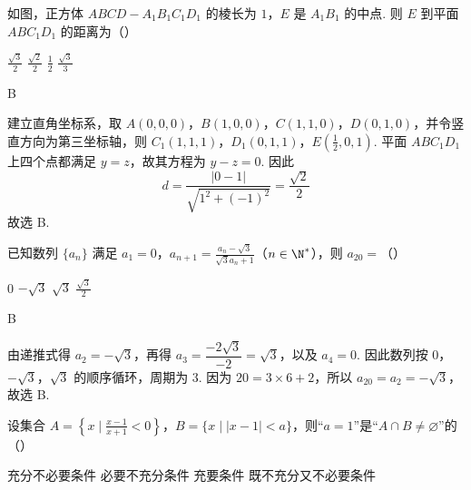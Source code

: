 \begin{problem}
如图，正方体 \(ABCD - A_{1}B_{1}C_{1}D_{1}\) 的棱长为 \(1\)，\(E\) 是 \(A_{1}B_{1}\) 的中点. 则 \(E\) 到平面 \(ABC_{1}D_{1}\) 的距离为（\quad）


\choices
    {\(\frac{\sqrt{3}}{2}\)}
    {\(\frac{\sqrt{2}}{2}\)}
    {\(\frac{1}{2}\)}
    {\(\frac{\sqrt{3}}{3}\)}
\end{problem}

\begin{answer}
B
\end{answer}

\begin{solution}
建立直角坐标系，取 \(A(0,0,0)\)，\(B(1,0,0)\)，\(C(1,1,0)\)，\(D(0,1,0)\)，并令竖直方向为第三坐标轴，则 \(C_{1}(1,1,1)\)，\(D_{1}(0,1,1)\)，\(E\left(\frac12,0,1\right)\). 平面 \(ABC_{1}D_{1}\) 上四个点都满足 \(y=z\)，故其方程为 \(y-z=0\). 因此
\[
d=\frac{\left|0-1\right|}{\sqrt{1^2+(-1)^2}}=\frac{\sqrt{2}}{2}
\]
故选 B.
\end{solution}

\begin{problem}
已知数列 \(\{a_{n}\}\) 满足 \(a_{1} = 0\)，\(a_{n + 1} = \frac{a_{n} - \sqrt{3}}{\sqrt{3}a_{n} + 1}\)（\(n \in \N^{*}\)），则 \(a_{20} =\)（\quad）

\choices
    {0}
    {\(-\sqrt{3}\)}
    {\(\sqrt{3}\)}
    {\(\frac{\sqrt{3}}{2}\)}
\end{problem}

\begin{answer}
B
\end{answer}

\begin{solution}
由递推式得 \(a_{2}=-\sqrt{3}\)，再得
\(a_{3}=\dfrac{-2\sqrt{3}}{-2}=\sqrt{3}\)，以及 \(a_{4}=0\). 因此数列按 \(0\)，\(-\sqrt{3}\)，\(\sqrt{3}\) 的顺序循环，周期为 \(3\). 因为 \(20=3\times6+2\)，所以 \(a_{20}=a_{2}=-\sqrt{3}\)，故选 B.
\end{solution}

\begin{problem}
设集合 \(A = \left\{x \mid \frac{x - 1}{x + 1} < 0\right\}\)，\(B = \{x \mid |x - 1| < a\}\)，则“\(a = 1\)”是“\(A \cap B \neq \varnothing\)”的（\quad）

\choices
    {充分不必要条件}
    {必要不充分条件}
    {充要条件}
    {既不充分又不必要条件}
\end{problem}

